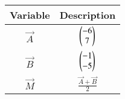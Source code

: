 \begin{tabular}[15pt]{ |c| c|}
    \hline
    \textbf{Variable} & \textbf{Description}\\ 
    \hline
    $\vec{A}$ & $\begin{pmatrix}-6\\7\end{pmatrix}$ \\
    \hline 
    $\vec{B}$ & $\begin{pmatrix}-1\\-5\end{pmatrix}$ \\
	\hline
    $\vec{M}$ & $\frac{\vec{A}+\vec{B}}{2}$\\
    \hline 
    \end{tabular}
